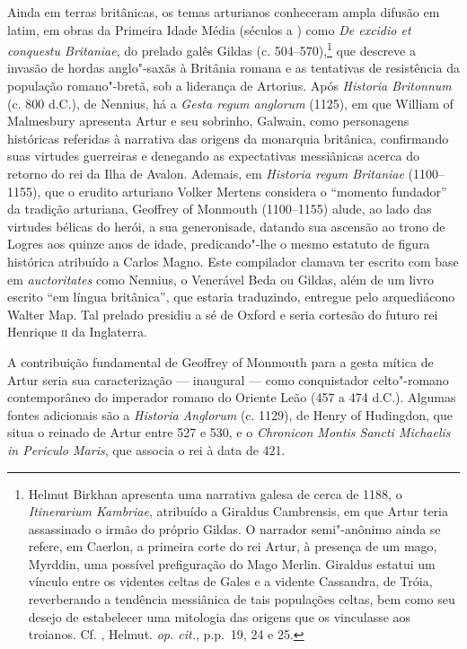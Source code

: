 Ainda em terras britânicas, os temas arturianos conheceram ampla difusão em
latim, em obras da Primeira Idade Média (séculos  a ) como \textit{De
excidio et conquestu Britaniae}, do prelado galês Gildas (c. 504--570),\footnote{
Helmut Birkhan apresenta uma narrativa galesa de cerca de 1188, o
\textit{Itinerarium Kambriae}, atribuído a Giraldus Cambrensis, em que Artur
teria assassinado o irmão do próprio Gildas. O narrador semi"-anônimo ainda se
refere, em Caerlon, a primeira corte do rei Artur, à presença de um mago,
Myrddin, uma possível prefiguração do Mago Merlin. Giraldus estatui um vínculo
entre os videntes celtas de Gales e a vidente Cassandra, de Tróia, reverberando
a tendência messiânica de tais populações celtas, bem como seu desejo de
estabelecer uma mitologia das origens que os vinculasse aos troianos. Cf.
, Helmut. \textit{op. cit.}, p.p.~19, 24 e 25. } que descreve a invasão
de hordas anglo"-saxãs à Britânia romana e as tentativas de resistência da
população romano"-bretã, sob a liderança de Artorius. Após \textit{Historia
Britonnum} (c. 800 d.C.), de Nennius, há a \textit{Gesta regum anglorum }(1125), em
que William of Malmesbury apresenta Artur e seu sobrinho, Galwain, como
personagens históricas referidas à narrativa das origens da monarquia
britânica, confirmando suas virtudes guerreiras e denegando as expectativas
messiânicas acerca do retorno do rei da Ilha de Avalon. Ademais, em
\textit{Historia regum Britaniae }(1100--1155), que o erudito arturiano Volker
Mertens considera o “momento fundador” da tradição arturiana, Geoffrey of
Monmouth (1100--1155) alude, ao lado das virtudes bélicas do herói, a sua generonisade,
datando sua ascensão ao trono de Logres aos quinze anos de idade, predicando"-lhe o
mesmo estatuto de figura histórica atribuído a Carlos Magno. Este compilador
clamava ter escrito com base em \textit{auctoritates} como Nennius, o Venerável
Beda ou Gildas, além de um livro escrito “em língua britânica”, que estaria
traduzindo, entregue pelo arquediácono Walter Map. Tal prelado presidiu a sé de Oxford
e seria cortesão do futuro rei Henrique \textsc{ii} da Inglaterra.

A contribuição fundamental de Geoffrey of Monmouth para a gesta mítica de Artur
seria sua caracterização --- inaugural --- como conquistador celto"-romano
contemporâneo do imperador romano do Oriente Leão  (457 a 474 d.C.).
Algumas fontes adicionais são a \textit{Historia Anglorum} (c. 1129), de Henry
of Hudingdon, que situa o reinado de Artur entre 527 e 530, e o
\textit{Chronicon Montis Sancti Michaelis in Periculo Maris}, que associa o rei
à data de 421.

